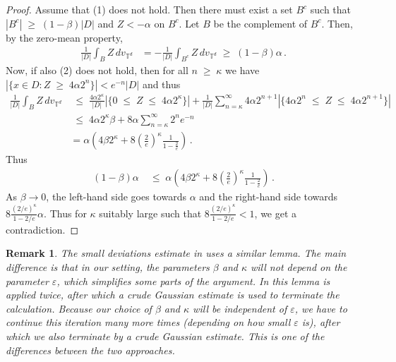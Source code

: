 \documentclass[11pt]{article}
\numberwithin{equation}{section}
\newtheorem{remark}[theorem]{Remark}
\theoremstyle{definition}
\renewcommand{\leq}{\;\leqslant\;}                   %
\renewcommand{\geq}{\;\geqslant\;}                   %
\def\eps{\varepsilon}
\def\T{\mathbb{T}}
\newcommand{\ab}{|}
\begin{document}
\begin{proof}
Assume that (1) does not hold. Then there must exist a set $B^c$ such that $\ab B^c \ab \geq (1-\beta) \ab D\ab$ and $Z \less -\alpha$ on $B^c$. Let $B$ be the complement of $B^c$. Then, by the zero-mean property,
\begin{align*}
 \frac{1}{\ab D \ab} \int_B Z \, dv_{\T^d} &= -\frac{1}{\ab D \ab} \int_{B^c} Z \, dv_{\T^d} \geq (1-\beta) \alpha \,.
\end{align*}
Now, if also (2) does not hold, then for all $n \geq \kappa$ we have $\ab \{x \in D: Z \geq 4\alpha 2^n \} \ab \less e^{-n} \ab D \ab$ and thus 
\begin{align*}
\frac{1}{\ab D \ab} \int_B Z \, dv_{\T^d} & \leq \frac{4 \alpha 2^\kappa}{\ab D \ab}  \ab \{ 0 \leq Z \leq 4 \alpha 2^{\kappa}\} \ab + \frac{1}{\ab D \ab} \sum_{n= \kappa}^\infty 4 \alpha 2^{n+1} \ab \{ 4 \alpha  2^n \leq Z \leq 4 \alpha 2^{n+1} \} \ab  \\
& \leq 4 \alpha 2^\kappa \beta  + 8\alpha \sum_{n=\kappa}^\infty 2^n e^{-n} \\
&= \alpha \left( 4 \beta 2^\kappa + 8 ( \tfrac 2e )^\kappa \tfrac{1}{1- \frac{2}{e}}  \right)\,.
\end{align*}
Thus 
\begin{align*}
(1-\beta) \alpha & \leq \alpha \left( 4 \beta 2^\kappa + 8  ( \tfrac 2e )^\kappa \tfrac{1}{1- \frac{2}{e}}  \right)\,.
\end{align*}
As $\beta \to 0$, the left-hand side goes towards $\alpha$ and the right-hand side towards $ 8 \frac{ (2/e)^\kappa}{1-2/e} \alpha$. Thus for $\kappa$ suitably large such that $ 8 \frac{ (2/e)^\kappa}{1-2/e} \less 1$, we get a contradiction.
\end{proof}

\begin{remark}
The small deviations estimate in \cite{LRV} uses a similar lemma. The main difference is that in our setting, the parameters $\beta$ and $\kappa$ will not depend on the parameter $\eps$, which simplifies some parts of the argument. In \cite{LRV} this lemma is applied twice, after which a crude Gaussian estimate is used to terminate the calculation. Because our choice of $\beta$ and $\kappa$ will be independent of $\eps$, we have to continue this iteration many more times (depending on how small $\eps$ is), after which we also terminate by a crude Gaussian estimate. This is one of the differences between the two approaches.
\end{remark}
\noindent
\end{document}
